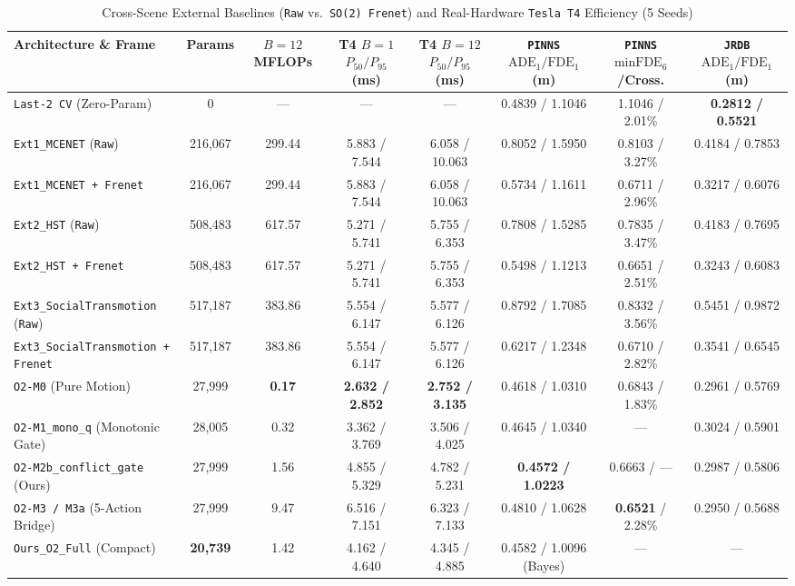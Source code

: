 \documentclass[journal]{IEEEtran}
\begin{document}
\begin{table}[!t]
\centering
\caption{Cross-Scene External Baselines (\texttt{Raw} vs.\ \texttt{SO(2) Frenet}) and Real-Hardware \texttt{Tesla T4} Efficiency (5 Seeds)}
\label{tab:ext_t4}
\footnotesize
\begin{tabular}{lccccccc}
\toprule
Architecture \& Frame & Params & $B{=}12$ MFLOPs & T4 $B{=}1$ $P_{50}/P_{95}$ (ms) & T4 $B{=}12$ $P_{50}/P_{95}$ (ms) & \texttt{PINNS} $\text{ADE}_1 / \text{FDE}_1$ (m) & \texttt{PINNS} $\text{minFDE}_6$/Cross. & \texttt{JRDB} $\text{ADE}_1 / \text{FDE}_1$ (m) \\
\midrule
\texttt{Last-2 CV} (Zero-Param) & 0 & --- & --- & --- & 0.4839 / 1.1046 & 1.1046 / 2.01\% & \textbf{0.2812 / 0.5521} \\
\texttt{Ext1\_MCENET} (\texttt{Raw}) & 216,067 & 299.44 & 5.883 / 7.544 & 6.058 / 10.063 & 0.8052 / 1.5950 & 0.8103 / 3.27\% & 0.4184 / 0.7853 \\
\texttt{Ext1\_MCENET + Frenet} & 216,067 & 299.44 & 5.883 / 7.544 & 6.058 / 10.063 & 0.5734 / 1.1611 & 0.6711 / 2.96\% & 0.3217 / 0.6076 \\
\texttt{Ext2\_HST} (\texttt{Raw}) & 508,483 & 617.57 & 5.271 / 5.741 & 5.755 / 6.353 & 0.7808 / 1.5285 & 0.7835 / 3.47\% & 0.4183 / 0.7695 \\
\texttt{Ext2\_HST + Frenet} & 508,483 & 617.57 & 5.271 / 5.741 & 5.755 / 6.353 & 0.5498 / 1.1213 & 0.6651 / 2.51\% & 0.3243 / 0.6083 \\
\texttt{Ext3\_SocialTransmotion} (\texttt{Raw}) & 517,187 & 383.86 & 5.554 / 6.147 & 5.577 / 6.126 & 0.8792 / 1.7085 & 0.8332 / 3.56\% & 0.5451 / 0.9872 \\
\texttt{Ext3\_SocialTransmotion + Frenet} & 517,187 & 383.86 & 5.554 / 6.147 & 5.577 / 6.126 & 0.6217 / 1.2348 & 0.6710 / 2.82\% & 0.3541 / 0.6545 \\
\texttt{O2-M0} (Pure Motion) & 27,999 & \textbf{0.17} & \textbf{2.632 / 2.852} & \textbf{2.752 / 3.135} & 0.4618 / 1.0310 & 0.6843 / 1.83\% & 0.2961 / 0.5769 \\
\texttt{O2-M1\_mono\_q} (Monotonic Gate) & 28,005 & 0.32 & 3.362 / 3.769 & 3.506 / 4.025 & 0.4645 / 1.0340 & --- & 0.3024 / 0.5901 \\
\texttt{O2-M2b\_conflict\_gate} (Ours) & 27,999 & 1.56 & 4.855 / 5.329 & 4.782 / 5.231 & \textbf{0.4572 / 1.0223} & 0.6663 / --- & 0.2987 / 0.5806 \\
\texttt{O2-M3 / M3a} (5-Action Bridge) & 27,999 & 9.47 & 6.516 / 7.151 & 6.323 / 7.133 & 0.4810 / 1.0628 & \textbf{0.6521} / 2.28\% & 0.2950 / 0.5688 \\
\texttt{Ours\_O2\_Full} (Compact) & \textbf{20,739} & 1.42 & 4.162 / 4.640 & 4.345 / 4.885 & 0.4582 / 1.0096 (Bayes) & --- & --- \\
\bottomrule
\end{tabular}
\end{table}
\end{document}
